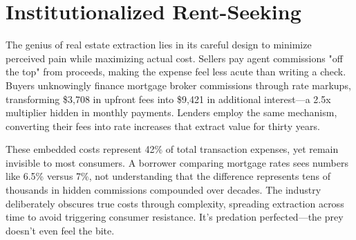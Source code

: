 \section{Institutionalized Rent-Seeking}

The genius of real estate extraction lies in its careful design to minimize perceived pain while maximizing actual cost. Sellers pay agent commissions "off the top" from proceeds, making the expense feel less acute than writing a check. Buyers unknowingly finance mortgage broker commissions through rate markups, transforming \$3,708 in upfront fees into \$9,421 in additional interest—a 2.5x multiplier hidden in monthly payments. Lenders employ the same mechanism, converting their fees into rate increases that extract value for thirty years.

These embedded costs represent 42\% of total transaction expenses, yet remain invisible to most consumers. A borrower comparing mortgage rates sees numbers like 6.5\% versus 7\%, not understanding that the difference represents tens of thousands in hidden commissions compounded over decades. The industry deliberately obscures true costs through complexity, spreading extraction across time to avoid triggering consumer resistance. It's predation perfected—the prey doesn't even feel the bite.

